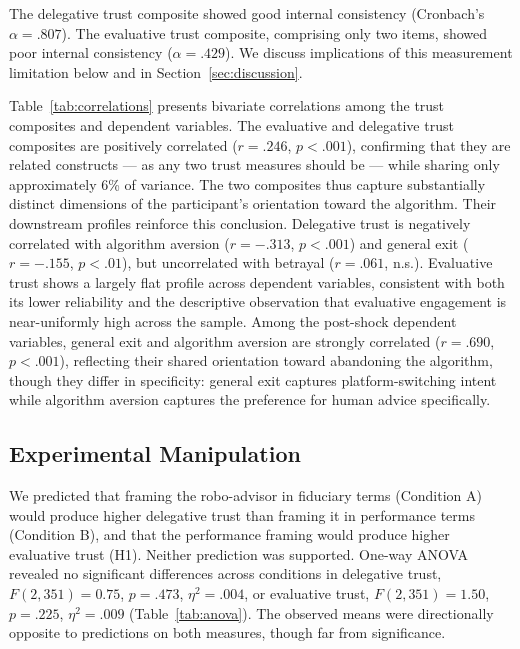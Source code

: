 The delegative trust composite showed good internal consistency (Cronbach's $\alpha = .807$). The evaluative trust composite, comprising only two items, showed poor internal consistency ($\alpha = .429$). We discuss implications of this measurement limitation below and in Section~\ref{sec:discussion}.

Table~\ref{tab:correlations} presents bivariate correlations among the trust composites and dependent variables. The evaluative and delegative trust composites are positively correlated ($r = .246$, $p < .001$), confirming that they are related constructs --- as any two trust measures should be --- while sharing only approximately 6\% of variance. The two composites thus capture substantially distinct dimensions of the participant's orientation toward the algorithm. Their downstream profiles reinforce this conclusion. Delegative trust is negatively correlated with algorithm aversion ($r = -.313$, $p < .001$) and general exit ($r = -.155$, $p < .01$), but uncorrelated with betrayal ($r = .061$, n.s.). Evaluative trust shows a largely flat profile across dependent variables, consistent with both its lower reliability and the descriptive observation that evaluative engagement is near-uniformly high across the sample. Among the post-shock dependent variables, general exit and algorithm aversion are strongly correlated ($r = .690$, $p < .001$), reflecting their shared orientation toward abandoning the algorithm, though they differ in specificity: general exit captures platform-switching intent while algorithm aversion captures the preference for human advice specifically.



\subsection{Experimental Manipulation}

We predicted that framing the robo-advisor in fiduciary terms (Condition A) would produce higher delegative trust than framing it in performance terms (Condition B), and that the performance framing would produce higher evaluative trust (H1). Neither prediction was supported. One-way ANOVA revealed no significant differences across conditions in delegative trust, $F(2, 351) = 0.75$, $p = .473$, $\eta^2 = .004$, or evaluative trust, $F(2, 351) = 1.50$, $p = .225$, $\eta^2 = .009$ (Table~\ref{tab:anova}). The observed means were directionally opposite to predictions on both measures, though far from significance.

